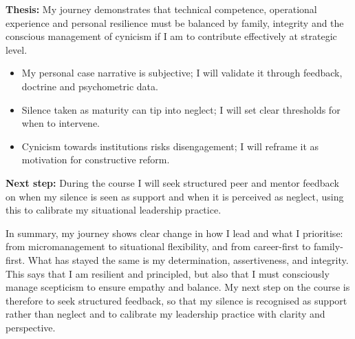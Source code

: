 \textbf{Thesis:} My journey demonstrates that technical competence, operational experience and personal resilience must be balanced by family, integrity and the conscious management of cynicism if I am to contribute effectively at strategic level.  

\begin{itemize}
	\item My personal case narrative is subjective; I will validate it through feedback, doctrine and psychometric data.  
	\item Silence taken as maturity can tip into neglect; I will set clear thresholds for when to intervene.  
	\item Cynicism towards institutions risks disengagement; I will reframe it as motivation for constructive reform.  
\end{itemize}  

\textbf{Next step:} During the course I will seek structured peer and mentor feedback on when my silence is seen as support and when it is perceived as neglect, using this to calibrate my situational leadership practice.

In summary, my journey shows clear change in how I lead and what I prioritise: from micromanagement to situational flexibility, and from career-first to family-first. What has stayed the same is my determination, assertiveness, and integrity. This says that I am resilient and principled, but also that I must consciously manage scepticism to ensure empathy and balance. My next step on the course is therefore to seek structured feedback, so that my silence is recognised as support rather than neglect and to calibrate my leadership practice with clarity and perspective.
